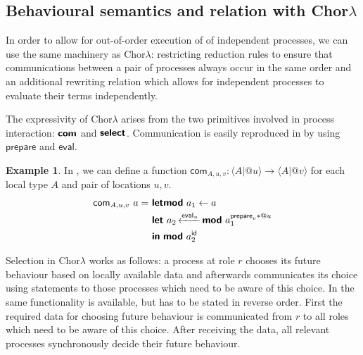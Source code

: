 \documentclass{scrartcl}
\theoremstyle{definition}
\newtheorem{example}{Example}
\theoremstyle{plain}
\begin{document}
\subsection{Behavioural semantics and relation with Chor$\lambda$}

In order to allow for out-of-order execution of of independent processes, we can use
the same machinery as Chor$\lambda$: restricting reduction rules to ensure that
communications between a pair of processes always occur in the same order and an
additional rewriting relation which allows for independent processes to evaluate
their terms independently.

The expressivity of Chor$\lambda$ arises from the two primitives involved in
process interaction: $\textsf{\textbf{com}}$ and $\textsf{\textbf{select}}$. Communication is
easily reproduced in \ChorMTT{} by using $\textsf{prepare}$ and $\textsf{eval}$.
\begin{example}
In \ChorMTT, we can define a function $\textsf{com}_{A,u,v} : \langle A | @u
\rangle \to \langle A | @v \rangle$ for each local type $A$ and pair of locations
$u,v$.
\begin{align*}\setlength{\jot}{0.5ex}
  \textsf{com}_{A,u,v}\ a =
  \ & \primitive{letmod}\ a_1 \leftarrow a\\
    & \primitive{let}\ a_2 \onleftarrow{\textsf{eval}_u}
        \primitive{mod}\ a_1^{\textsf{prepare}_v * @u}\\
    & \primitive{in}\ \primitive{mod}\ a_2^{\textsf{id}}
\end{align*}
\end{example}
Selection in Chor$\lambda$ works as follows: a process at role $r$
chooses its future behaviour based on locally available data and afterwards
communicates its choice using  statements to those processes which need to
be aware of this choice. In \ChorMTT{} the same functionality is available, but has
to be stated in reverse order. First the required data for choosing future
behaviour is communicated from $r$ to all roles which need to be aware of this
choice. After receiving the data, all relevant processes synchronously decide
their future behaviour.
\end{document}
